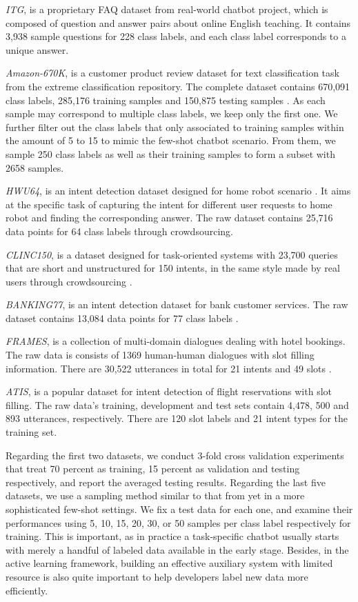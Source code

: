 \emph{ITG}, is a proprietary FAQ dataset from real-world
chatbot project, which is composed of question and answer pairs about online
English teaching. It contains 3,938 sample questions for 228 class labels, and
each class label corresponds to a unique answer.

\emph{Amazon-670K}, is a customer product review dataset for
text classification task from the extreme classification repository. The
complete dataset contains 670,091 class labels, 285,176 training samples and
150,875 testing samples \cite{bhatia2016extreme}. As each sample may
correspond to multiple class labels, we keep only the first one. We further
filter out the class labels that only associated to training samples within the amount of 5 to 15 to mimic the few-shot chatbot scenario. From them, we sample 250 class
labels as well as their training samples to form a subset with 2658 samples.

\emph{HWU64}, is an intent detection dataset designed for
home robot scenario \cite{liu2019benchmarking}. It aims at the specific task
of capturing the intent for different user requests to home robot and
finding the corresponding answer. The raw dataset contains 25,716 data points
for 64 class labels through crowdsourcing.

\emph{CLINC150}, is a dataset designed for task-oriented
systems with 23,700 queries that are short and unstructured for 150 intents,
in the same style made by real users through crowdsourcing
\cite{larson2019evaluation}.

\emph{BANKING77}, is an intent detection dataset for bank
customer services. The raw dataset contains 13,084 data points for 77 class
labels \cite{casanueva2020efficient}.

\emph{FRAMES}, is a collection of multi-domain dialogues dealing with
hotel bookings. The raw data is consists of 1369 human-human
dialogues with slot filling information. There are 30,522 utterances in total for 21 intents and 49 slots \cite{asri2017frames}.

\emph{ATIS}, is a popular dataset for intent detection of flight reservations with slot filling\cite{tur2010left}. The raw data's training, development and test sets contain 4,478, 500 and 893 utterances, respectively. There are 120 slot labels and 21 intent types for the training set.

Regarding the first two datasets, we conduct 3-fold cross validation experiments that treat 70 percent as training, 15 percent as validation and testing respectively, and report the averaged testing results. 
Regarding the last five datasets, we use a sampling method similar to that from \cite{casanueva2020efficient} yet in a more sophisticated few-shot settings. 
We fix a test data for each one, and examine their performances using 5, 10, 15, 20, 30, or 50 samples per class label respectively for training. 
This is important, as in practice a task-specific chatbot usually starts with merely a handful of labeled data available in the early stage.
Besides, in the active learning framework, building an effective auxiliary system with limited resource is also quite important to help developers label new data more efficiently.

